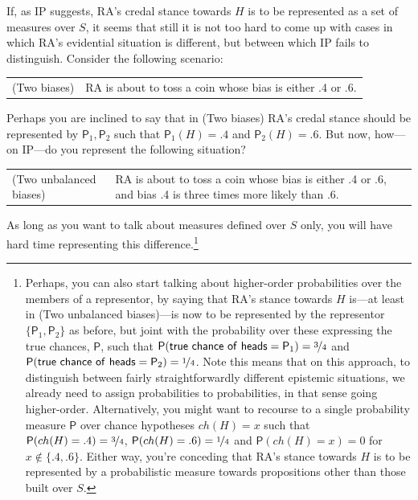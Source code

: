 \documentclass[
  10pt,
  dvipsnames,enabledeprecatedfontcommands]{scrartcl}
\begin{document}
If, as IP suggests, RA's credal stance towards \(H\) is to be
represented as a set of measures over \(S\), it seems that still it is
not too hard to come up with cases in which RA's evidential situation is
different, but between which IP fails to distinguish. Consider the
following scenario:

\begin{center}
\begin{tabular}{lp{9cm}}
(Two biases) & RA is about to toss a coin whose bias is either .4 or .6.
\end{tabular}
\end{center}

\noindent Perhaps you are inclined to say that in (Two biases) RA's
credal stance should be represented by \(\mathsf{P}_1, \mathsf{P}_2\)
such that \(\mathsf{P}_1(H)=.4\) and \(\mathsf{P}_2(H)=.6\). But now,
how---on IP---do you represent the following situation?

\begin{center}
\begin{tabular}{lp{9cm}}
(Two unbalanced biases) & RA is about to toss a coin whose bias is either .4 or .6, and bias .4 is three times  more likely than .6.
\end{tabular}
\end{center}

\noindent As long as you want to talk about measures defined over \(S\)
only, you will have hard time representing this
difference.\footnote{Perhaps, you can also start talking about higher-order probabilities over the members of  a representor, by saying that RA's stance towards $H$ is---at least in (Two unbalanced biases)---is  now to be represented by the representor $\{\mathsf{P}_1, \mathsf{P}_2\}$ as before, but joint with the probability over these expressing the true chances, $\mathsf{P}$, such that $\mathsf{P}(\mathsf{true\,\, chance \,\, of \,\, heads } = \mathsf{P}_1) =\nicefrac{3}{4}$ and $\mathsf{P}(\mathsf{true\,\, chance \,\, of \,\, heads } = \mathsf{P}_2) =\nicefrac{1}{4}$. Note this means that on this approach, to distinguish between  fairly straightforwardly different epistemic situations, we already need to assign probabilities to probabilities, in that sense going higher-order. Alternatively, you might want to recourse to a single probability measure $\mathsf{P}$ over chance hypotheses $ch(H)=x$ such that $\mathsf{P}(ch(H)=.4)=\nicefrac{3}{4}$, $\mathsf{P}(ch(H)=.6)=\nicefrac{1}{4}$ and $\mathsf{P}(ch(H)=x)=0$ for $x \not \in \{.4, .6\}$. Either way, you're conceding that RA's stance towards $H$ is to be represented by a probabilistic measure towards propositions other than those built over $S$.}
\end{document}
